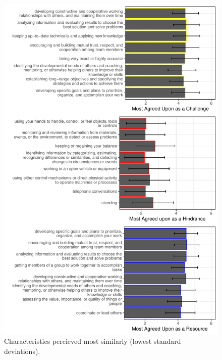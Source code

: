 \documentclass[
  man,mask]{apa6}
\begin{document}
\begin{figure}
\centering
\includegraphics{Submission_files/figure-latex/combinegraphs-1.pdf}
\caption{\label{fig:combinegraphs}Characteristics percieved most similarly (lowest standard deviations).}
\end{figure}
\end{document}
